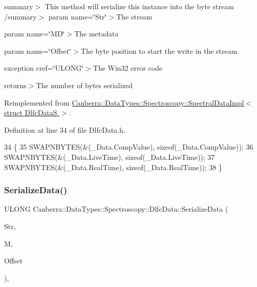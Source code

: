 summary$>$ This method will serialize this instance into the byte stream /summary$>$ param name=\char`\"{}\+Str\char`\"{}$>$The stream

param name=\char`\"{}\+M\+D\char`\"{}$>$The metadata

param name=\char`\"{}\+Offset\char`\"{}$>$The byte position to start the write in the stream

exception cref=\char`\"{}\+U\+L\+O\+N\+G\char`\"{}$>$The Win32 error code

returns$>$The number of bytes serialized

Reimplemented from \hyperlink{class_canberra_1_1_data_types_1_1_spectroscopy_1_1_spectral_data_impl_add8a76fab9523229280ad47efb9b5bf0_add8a76fab9523229280ad47efb9b5bf0}{Canberra\+::\+Data\+Types\+::\+Spectroscopy\+::\+Spectral\+Data\+Impl$<$ struct Dlfc\+Data\+S $>$}.



Definition at line 34 of file Dlfc\+Data.\+h.


\begin{DoxyCode}
34                                         \{
35                     SWAPNBYTES(&(\_Data.CompValue), \textcolor{keyword}{sizeof}(\_Data.CompValue));
36                     SWAPNBYTES(&(\_Data.LiveTime), \textcolor{keyword}{sizeof}(\_Data.LiveTime));
37                     SWAPNBYTES(&(\_Data.RealTime), \textcolor{keyword}{sizeof}(\_Data.RealTime));
38                 \}
\end{DoxyCode}
\mbox{\label{class_canberra_1_1_data_types_1_1_spectroscopy_1_1_dlfc_data_aacc250b1d3e769eddddad762028110de_aacc250b1d3e769eddddad762028110de}} 
\subsubsection{\texorpdfstring{Serialize\+Data()}{SerializeData()}}
{\footnotesize\ttfamily U\+L\+O\+NG Canberra\+::\+Data\+Types\+::\+Spectroscopy\+::\+Dlfc\+Data\+::\+Serialize\+Data (\begin{DoxyParamCaption}\item[{\hyperlink{class_canberra_1_1_utility_1_1_core_1_1_byte_stream}{Canberra\+::\+Utility\+::\+Core\+::\+Byte\+Stream} \&}]{Str,  }\item[{const \hyperlink{class_canberra_1_1_serialization_1_1_meta_data}{Canberra\+::\+Serialization\+::\+Meta\+Data} \&}]{M,  }\item[{const L\+O\+NG}]{Offset }\end{DoxyParamCaption})\hspace{0.3cm}{\ttfamily [inline]}, {\ttfamily [virtual]}}

